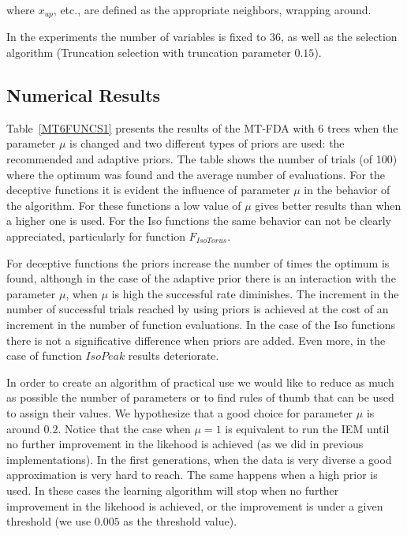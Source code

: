 \documentclass[runningheads]{llncs}
\begin{document}
where $x_{up}$, etc., are defined as the appropriate neighbors, wrapping 
around.

In the experiments the number of variables is fixed to $36$, as well
as the selection algorithm (Truncation selection with truncation parameter
$0.15$). 



\subsection{Numerical Results}



Table~\ref{MT6FUNCS1} presents the results of the MT-FDA with
$6$  trees when the parameter  $\mu$ is changed and two different types of
priors are used: the recommended and adaptive priors. The table shows the
number of trials (of 100) where the optimum was found  and the average number
of evaluations. For the deceptive functions it is
evident the influence of parameter $\mu$ in the behavior of the algorithm. For
these functions a low value of $\mu$ gives better results than when a higher one is
used.  For the Iso
functions the same behavior can not be clearly appreciated, particularly for
function $F_{IsoTorus}$. 

For deceptive functions the priors increase the number
of times the optimum is found, although in the case
of the adaptive prior there is an interaction with the parameter $\mu$, when  $\mu$
is high the successful rate diminishes.  The
increment in the number of successful trials reached by using priors is
achieved at the cost of an increment in the number of function
evaluations. In the case of the Iso functions there is
not a significative difference when priors are added. Even more, in the case
of function $IsoPeak$ results deteriorate.


In order to create an algorithm of practical use we would like to reduce as much as
possible the number of parameters or to find rules of thumb that can be used to assign
their values.  We hypothesize that a good choice for parameter $\mu$ is around
$0.2$. Notice that the case when $\mu=1$ is equivalent to run the IEM until no further
improvement in the likehood is achieved (as we did in previous implementations).  In the first generations, when the data is
very diverse a good approximation is very hard to reach. The same happens when a high
prior is used. In these cases the learning algorithm will stop when no further
improvement in the likehood  is achieved, or the improvement is under a given
threshold (we use $0.005$ as the threshold value).
\end{document}
